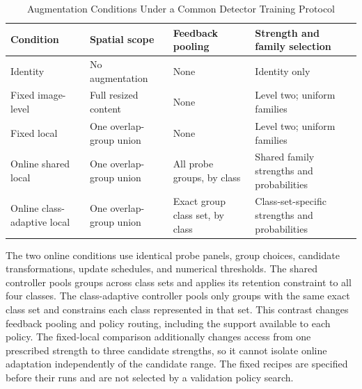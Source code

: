 \documentclass[conference]{IEEEtran}
\begin{document}
\begin{table}[t]
\caption{Augmentation Conditions Under a Common Detector Training Protocol}
\label{tab:augmentation_conditions}
\centering
\small
\setlength{\tabcolsep}{4pt}
\renewcommand{\arraystretch}{1.12}
\begin{tabularx}{\textwidth}{@{}p{}p{}p{}Y@{}}
\toprule
\textbf{Condition} & \textbf{Spatial scope} & \textbf{Feedback pooling} & \textbf{Strength and family selection} \\
\midrule
Identity & No augmentation & None & Identity only \\
Fixed image-level & Full resized content & None & Level two; uniform families \\
Fixed local & One overlap-group union & None & Level two; uniform families \\
Online shared local & One overlap-group union & All probe groups, by class & Shared family strengths and probabilities \\
Online class-adaptive local & One overlap-group union & Exact group class set, by class & Class-set-specific strengths and probabilities \\
\bottomrule
\end{tabularx}
\end{table}

The two online conditions use identical probe panels, group choices, candidate transformations, update schedules, and numerical thresholds. The shared controller pools groups across class sets and applies its retention constraint to all four classes. The class-adaptive controller pools only groups with the same exact class set and constrains each class represented in that set. This contrast changes feedback pooling and policy routing, including the support available to each policy. The fixed-local comparison additionally changes access from one prescribed strength to three candidate strengths, so it cannot isolate online adaptation independently of the candidate range. The fixed recipes are specified before their runs and are not selected by a validation policy search.
\end{document}

